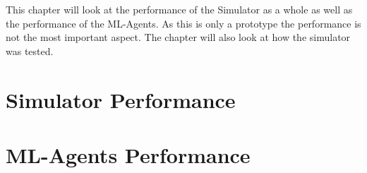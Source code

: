 This chapter will look at the performance of the Simulator as a whole as well as the performance of the ML-Agents. As this is only a prototype the performance is not the most important aspect. The chapter will also look at how the simulator was tested.

\section{Simulator Performance}

\section{ML-Agents Performance}